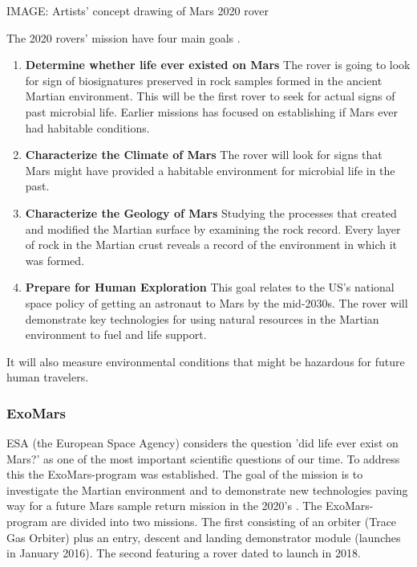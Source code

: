 
IMAGE: Artists’ concept drawing of Mars 2020 rover

The 2020 rovers’ mission have four main goals \cite{FPlan13}.

\begin{enumerate}
	\item \textbf{Determine whether life ever existed on Mars}
The rover is going to look for sign of biosignatures preserved in rock samples formed in the ancient Martian environment.
This will be the first rover to seek for actual signs of past microbial life.
Earlier missions has focused on establishing if Mars ever had habitable conditions.
	\item \textbf{Characterize the Climate of Mars}
The rover will look for signs that Mars might have provided a habitable environment for microbial life in the past.
	\item \textbf{Characterize the Geology of Mars}
Studying the processes that created and modified the Martian surface by examining the rock record.
Every layer of rock in the Martian crust reveals a record of the environment in which it was formed.
	\item \textbf{Prepare for Human Exploration}
This goal relates to the US’s national space policy of getting an astronaut to Mars by the mid-2030s.
The rover will demonstrate key technologies for using natural resources in the Martian environment to fuel and life support.
\end{enumerate}

It will also measure environmental conditions that might be hazardous for future human travelers. 

\subsubsection*{ExoMars}

ESA (the European Space Agency) considers the question 'did life ever exist on Mars?' as one of the most important scientific questions of our time.
To address this the ExoMars-program was established.
The goal of the mission is to investigate the Martian environment and to demonstrate new technologies paving way for a future Mars sample return mission in the 2020’s \cite{FPlan02}. 
The ExoMars-program are divided into two missions.
The first consisting of an orbiter (Trace Gas Orbiter) plus an entry, descent and landing demonstrator module (launches in January 2016).
The second featuring a rover dated to launch in 2018.
 
